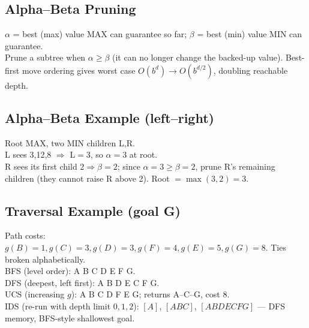 \subsection*{Alpha--Beta Pruning}
\(\alpha\) = best (max) value MAX can guarantee so far; \(\beta\) = best (min) value MIN can guarantee.\\
Prune a subtree when \(\alpha\ge\beta\) (it can no longer change the backed-up value). Best-first move ordering gives worst case \(O(b^d)\to O(b^{d/2})\), doubling reachable depth.

\subsection*{Alpha--Beta Example (left--right)}
Root MAX, two MIN children L,R.\\
L sees 3,12,8 \(\Rightarrow\) L\(=3\), so \(\alpha=3\) at root.\\
R sees its first child \(2\Rightarrow\beta=2\); since \(\alpha=3\ge\beta=2\), prune R's remaining children (they cannot raise R above 2). Root \(=\max(3,2)=3\).

\subsection*{Traversal Example (goal G)}
Path costs: \(g(B){=}1,g(C){=}3,g(D){=}3,g(F){=}4,g(E){=}5,g(G){=}8\). Ties broken alphabetically.\\
BFS (level order): A B C D E F G.\\
DFS (deepest, left first): A B D E C F G.\\
UCS (increasing \(g\)): A B C D F E G; returns A--C--G, cost 8.\\
IDS (re-run with depth limit \(0,1,2\)): \([A]\), \([A B C]\), \([A B D E C F G]\) --- DFS memory, BFS-style shallowest goal.

